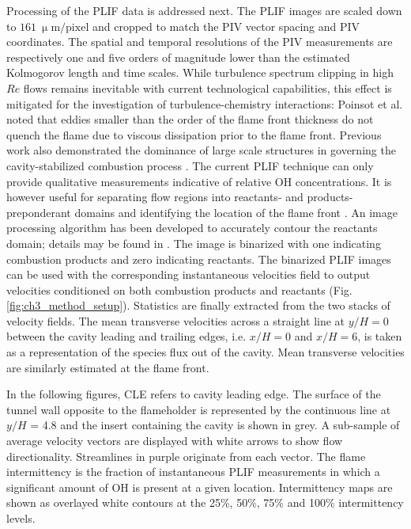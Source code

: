 Processing of the PLIF data is addressed next. The PLIF images are scaled down to $161~ \mathrm{\upmu m/pixel}$ and cropped to match the PIV vector spacing and PIV coordinates. The spatial and temporal resolutions of the PIV measurements are respectively one and five orders of magnitude lower than the estimated Kolmogorov length and time scales. While turbulence spectrum clipping in high $Re$ flows remains inevitable with current technological capabilities, this effect is mitigated for the investigation of turbulence-chemistry interactions: Poinsot et al. \cite{PoinsotVeynanteCandel1991} noted that eddies smaller than the order of the flame front thickness do not quench the flame due to viscous dissipation prior to the flame front. Previous work also demonstrated the dominance of large scale structures in governing the cavity-stabilized combustion process \citep{XavierVandelGodardEtAl2016}. 
The current PLIF technique can only provide qualitative measurements indicative of relative OH concentrations. It is however useful for separating flow regions into reactants- and products-preponderant domains and identifying the location of the flame front \citep{CantuGalloCutlerEtAl2016a}.  An image processing algorithm has been developed to accurately contour the reactants domain; details may be found in \citet{Geipel2019}. 
The image is binarized with one indicating combustion products and zero indicating reactants.  
The binarized PLIF images can be used with the corresponding instantaneous velocities field to output velocities conditioned on both combustion products and reactants (Fig. \ref{fig:ch3_method_setup}). Statistics are finally extracted from the two stacks of velocity fields. The mean transverse velocities across a straight line at $y/H=0$ between the cavity leading and trailing edges, i.e. $x/H=0$ and $x/H=6$, is taken as a representation of the species flux out of the cavity. Mean transverse velocities are similarly estimated at the flame front. 

In the following figures, CLE refers to cavity leading edge. The surface of the tunnel wall opposite to the flameholder is represented by the continuous line at $y/H$ = 4.8 and the insert containing the cavity is shown in grey. A sub-sample of average velocity vectors are displayed with white arrows to show flow directionality. Streamlines in purple originate from each vector.
The flame intermittency is the fraction of instantaneous PLIF measurements in which a significant amount of OH is present at a given location. Intermittency maps are shown as overlayed white contours at the 25\%, 50\%, 75\% and 100\% intermittency levels.

